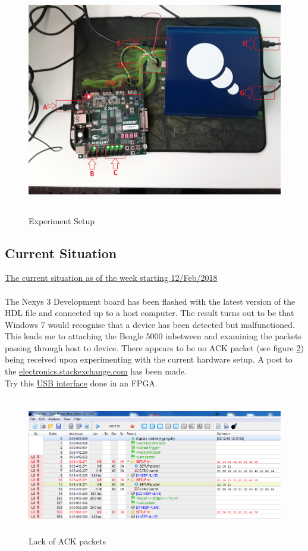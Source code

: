 \documentclass[10pt,a4paper]{article}
\begin{document}
\begin{figure}
	\includegraphics[width=12cm,height=10cm]{Experiment_Setup.jpg}
	\caption{Experiment Setup}
	\label{fig:Experiment Setup}
\end{figure}

\subsection{Current Situation}
\underline{The current situation as of the week starting 12/Feb/2018}\\\\
The Nexys 3 Development board has been flashed with the latest version of the HDL file and connected up to a host computer. The result turns out to be that Windows 7 would recognise that a device has been detected but malfunctioned. This leads me to attaching the Beagle 5000 inbetween and examining the packets passing through host to device. There appears to be no ACK packet (see figure \ref{fig:Lack of ACK packets}) being received upon experimenting with the current hardware setup. A post to the \href{https://electronics.stackexchange.com/questions/355777/lack-of-ack-packets-appears-to-cause-custom-usb-core-to-not-work}{electronics.stackexchange.com} has been made.\\

Try this \href{http://www.xess.com/projects/fpga-usb-v2-project/}{USB interface} done in an FPGA.

\begin{figure}
	\includegraphics[width=12cm,height=6cm]{no_ACK_packets.PNG}
	\caption{Lack of ACK packets}
	\label{fig:Lack of ACK packets}
\end{figure}
\end{document}
